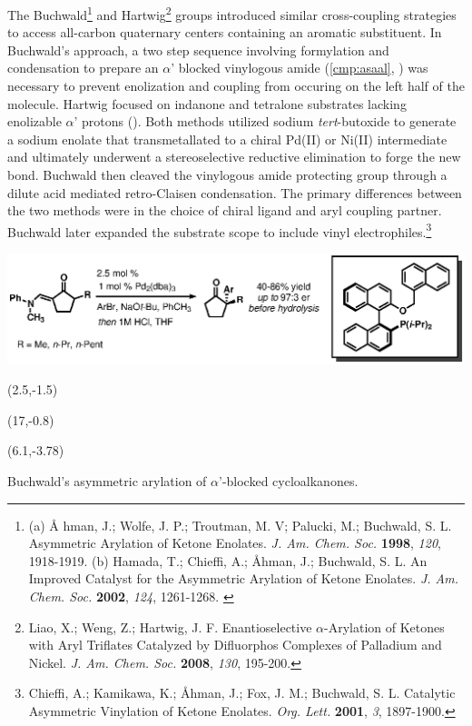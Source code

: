 The Buchwald\footnote{(a) {\frenchspacing \AA
hman, J.; Wolfe, J.
P.; Troutman, M.
V; Palucki, M.; Buchwald, S. L. Asymmetric Arylation of Ketone Enolates. \textit{J. Am. Chem. Soc.}
 \textbf{1998}, \textit{120}, 1918-1919.} (b) {\frenchspacing Hamada, T.; Chieffi, A.; \AA hman, J.; Buchwald, S. L. An Improved Catalyst for the Asymmetric Arylation of Ketone Enolates. \textit{J. Am. Chem.
 Soc.} \textbf{2002}, \textit{124}, 1261-1268.} \label{ref:asbuchwaldarylation}} and
 Hartwig\footnote{{\frenchspacing Liao, X.; Weng, Z.; Hartwig, J. F. Enantioselective $\alpha$-Arylation of Ketones with Aryl Triflates Catalyzed by Difluorphos Complexes of Palladium
 and Nickel. \textit{J. Am. Chem. Soc.} \textbf{2008}, \textit{130}, 195-200.}} groups introduced similar cross-coupling strategies to access
 all-carbon quaternary centers containing an aromatic substituent. In Buchwald's approach, a two step sequence involving formylation and condensation to prepare an $\alpha$' blocked vinylogous amide
(\ref{cmp:asaal}, ) was necessary to prevent enolization and coupling
from occuring on the left half of the molecule.
Hartwig focused on indanone and tetralone substrates lacking enolizable $\alpha$' protons
().
Both methods utilized sodium \textit{tert}-butoxide to generate a sodium enolate that
transmetallated to a chiral Pd(II) or Ni(II) intermediate and ultimately underwent a stereoselective
reductive elimination to forge the new  bond. Buchwald then cleaved the vinylogous amide
protecting group through a dilute acid mediated retro-Claisen condensation. The primary differences
between the two methods were in the choice of chiral ligand and aryl coupling partner. Buchwald
later expanded the substrate scope to include vinyl electrophiles.\footnote{{\frenchspacing Chieffi, A.; Kamikawa, K.; \AA hman, J.; Fox, J. M.; Buchwald, S. L. Catalytic Asymmetric Vinylation of Ketone Enolates. \textit{Org. Lett.}
 \textbf{2001}, \textit{3}, 1897-1900.}}  
   \begin{Scheme}[h]
  \centering
  \includegraphics[scale=0.8]{chp_asymmetric/images/buchwaldarylation}
  \begin{textblock}{1}(2.5,-1.5)  \end{textblock}
  \begin{textblock}{1}(17,-0.8)  \end{textblock}
  \begin{textblock}{1}(6.1,-3.78)  \end{textblock}
  \caption{Buchwald's asymmetric arylation of $\alpha$'-blocked cycloalkanones.}
  \label{sch:asbuchwaldarylation}
\end{Scheme}   
